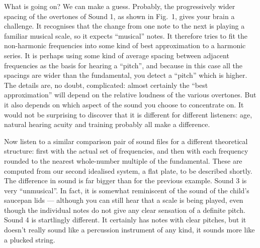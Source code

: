   What is going on? We can make a guess. Probably, the progressively wider 
  spacing of the overtones of Sound 1, as shown in Fig.\ 1, gives your brain a 
  challenge. It recognises that the change from one note to the next is playing 
  a familiar musical scale, so it expects ``musical'' notes. It therefore tries 
  to fit the non-harmonic frequencies into some kind of best approximation to a 
  harmonic series. It is perhaps using some kind of average spacing between 
  adjacent frequencies as the basis for hearing a ``pitch'', and because in 
  this case all the spacings are wider than the fundamental, you detect a 
  ``pitch'' which is higher. The details are, no doubt, complicated: almost 
  certainly the ``best approximation'' will depend on the relative loudness of 
  the various overtones. But it also depends on which aspect of the sound you 
  choose to concentrate on. It would not be surprising to discover that it is 
  different for different listeners: age, natural hearing acuity and training 
  probably all make a difference. 

  Now listen to a similar comparison pair of sound files for a different 
  theoretical structure: first with the actual set of frequencies, and then 
  with each frequency rounded to the nearest whole-number multiple of the 
  fundamental. These are computed from our second idealised system, a flat 
  plate, to be described shortly. The difference in sound is far bigger than 
  for the previous example. Sound 3 is very ``unmusical''. In fact, it is 
  somewhat reminiscent of the sound of the child's saucepan lids --- although 
  you can still hear that a scale is being played, even though the individual 
  notes do not give any clear sensation of a definite pitch. Sound 4 is 
  startlingly different. It certainly has notes with clear pitches, but it 
  doesn't really sound like a percussion instrument of any kind, it sounds more 
  like a plucked string. 




